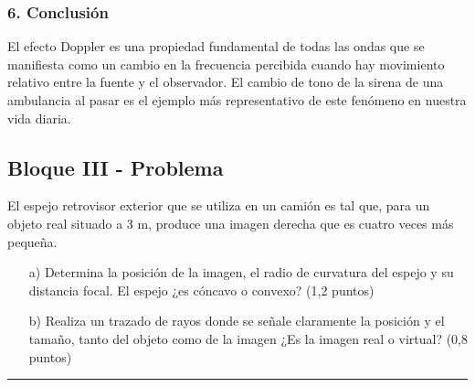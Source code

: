 \subsubsection*{6. Conclusión}
\begin{cajaconclusion}
El efecto Doppler es una propiedad fundamental de todas las ondas que se manifiesta como un cambio en la frecuencia percibida cuando hay movimiento relativo entre la fuente y el observador. El cambio de tono de la sirena de una ambulancia al pasar es el ejemplo más representativo de este fenómeno en nuestra vida diaria.
\end{cajaconclusion}

\newpage
\subsection{Bloque III - Problema}
\label{subsec:A3_2014_jun_ord}

\begin{cajaenunciado}
El espejo retrovisor exterior que se utiliza en un camión es tal que, para un objeto real situado a 3 m, produce una imagen derecha que es cuatro veces más pequeña.
\begin{enumerate}
    \item[a)] Determina la posición de la imagen, el radio de curvatura del espejo y su distancia focal. El espejo ¿es cóncavo o convexo? (1,2 puntos)
    \item[b)] Realiza un trazado de rayos donde se señale claramente la posición y el tamaño, tanto del objeto como de la imagen ¿Es la imagen real o virtual? (0,8 puntos)
\end{enumerate}
\end{cajaenunciado}
\hrule

